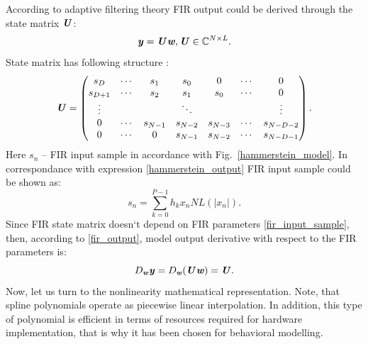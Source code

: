 \documentclass[12pt]{article}
\newcommand{\bit}[1]{\ensuremath{\textbf{\textit{#1}}}}
\begin{document}
According to adaptive filtering theory \cite{haykin} FIR output could be derived through the state matrix \bit{U}:
\begin{equation}
    \bit{y}=\bit{U}\bit{w}, \bit{U}\in\mathbb{C}^{N\times L}.
    \label{fir_output}
\end{equation}
State matrix has following structure \cite{haykin}:
\begin{equation*}
    \bit{U}=
    \begin{pmatrix}
        s_{D} & \cdots & s_1 & s_0 & 0 & \cdots & 0 \\
        s_{D+1} & \cdots & s_2 & s_1 & s_0 & \cdots & 0 \\
        \vdots & & & \ddots & & & \vdots \\
        0 & \cdots & s_{N-1} & s_{N-2} & s_{N-3} & \cdots & s_{N-D-2} \\
        0 & \cdots & 0 & s_{N-1} & s_{N-2} & \cdots & s_{N-D-1} \\
    \end{pmatrix}.
    \label{fir_state_matrix}
\end{equation*}
Here $s_n$ -- FIR input sample in accordance with Fig.~\ref{hammerstein_model}. In correspondance with expression \eqref{hammerstein_output} FIR input sample could be shown as:
\begin{equation}
    s_n=\sum_{k=0}^{P-1}h_k x_{n}NL(|x_{n}|).
    \label{fir_input_sample}
\end{equation}
Since FIR state matrix doesn`t depend on FIR parameters \eqref{fir_input_sample}, then, according to \eqref{fir_output}, model output derivative with respect to the FIR parameters is:
\begin{equation}
    D_{\bit{w}}\bit{y}=D_{\bit{w}}(\bit{U}\bit{w})=\bit{U}.
    \label{jacobian_fir}
\end{equation}
Now, let us turn to the nonlinearity mathematical representation. Note, that spline polynomials operate as piecewise linear interpolation. In addition, this type of polynomial is efficient in terms of resources required for hardware implementation, that is why it has been chosen for behavioral modelling. 
\end{document}
